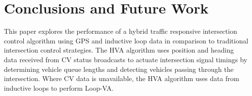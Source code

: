 \documentclass[numbered]{trbunofficial}
\begin{document}
\section{Conclusions and Future Work}\label{sec:conclusion}
This paper explores the performance of a hybrid traffic responsive intersection control algorithm using GPS and inductive loop data in comparison to traditional intersection control strategies. The HVA algorithm uses position and heading data received from CV status broadcasts to actuate intersection signal timings by determining vehicle queue lengths and detecting vehicles passing through the intersection. Where CV data is unavailable, the HVA algorithm uses data from inductive loops to perform Loop-VA.


\end{document}
